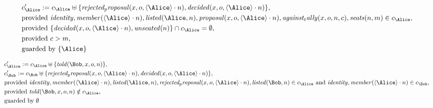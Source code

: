 \begin{align*}
&
c'_
{
\Alice
}
 := 
c_
{
\Alice
}
 \uplus 
\{
\mathit{
rejected_proposal
}
(
x
,
o
,
\langle
\Alice
\rangle
\cdot
n
)
,
\mathit{
decided
}
(
x
,
o
,
\langle
\Alice
\rangle
\cdot
n
)
\}
,\\
&
\text{provided } 
\mathit{
identity
}
,
\mathit{
member
}
(
\langle
\Alice
\rangle
\cdot
n
)
,
\mathit{
listed
}
(
\Alice
,
n
)
,
\mathit{
proposal
}
(
x
,
o
,
\langle
\Alice
\rangle
\cdot
n
)
,
\mathit{
against_tally
}
(
x
,
o
,
n
,
c
)
,
\mathit{
seats
}
(
n
,
m
)
 \in c_
{
\Alice
}
,\\
&
\text{provided } 
\{
\mathit{
decided
}
(
x
,
o
,
\langle
\Alice
\rangle
\cdot
n
)
,
\mathit{
unseated
}
(
n
)
\}
 \cap c_
{
\Alice
}
 = \emptyset
,\\
&
\text{provided } 
c
>
m
,\\
&
\text{guarded by } \{
\Alice
\}
\end{align*}

\begin{align*}
&
c'_
{
\Alice
}
 := 
c_
{
\Alice
}
 \uplus 
\{
\mathit{
told
}
(
\Bob
,
x
,
o
,
n
)
\}
,\\
&
c'_
{
\Bob
}
 := 
c_
{
\Bob
}
 \uplus 
\{
\mathit{
rejected_proposal
}
(
x
,
o
,
\langle
\Alice
\rangle
\cdot
n
)
,
\mathit{
decided
}
(
x
,
o
,
\langle
\Alice
\rangle
\cdot
n
)
\}
,\\
&
\text{provided } 
\mathit{
identity
}
,
\mathit{
member
}
(
\langle
\Alice
\rangle
\cdot
n
)
,
\mathit{
listed
}
(
\Alice
,
n
)
,
\mathit{
rejected_proposal
}
(
x
,
o
,
\langle
\Alice
\rangle
\cdot
n
)
,
\mathit{
listed
}
(
\Bob
,
n
)
 \in c_
{
\Alice
}
 \text{ and } 
\mathit{
identity
}
,
\mathit{
member
}
(
\langle
\Alice
\rangle
\cdot
n
)
 \in c_
{
\Bob
}
,\\
&
\text{provided } 
\mathit{
told
}
(
\Bob
,
x
,
o
,
n
)
 \notin c_
{
\Alice
}
,\\
&
\text{guarded by } \emptyset
\end{align*}
